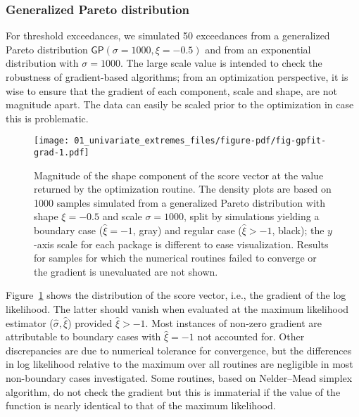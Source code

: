\documentclass[
  letterpaper,
  DIV=11,
  numbers=noendperiod]{scrartcl}
\begin{document}
\hypertarget{generalized-pareto-distribution}{%
\subsubsection{Generalized Pareto
distribution}\label{generalized-pareto-distribution}}

For threshold exceedances, we simulated 50 exceedances from a
generalized Pareto distribution \(\mathsf{GP}(\sigma=1000, \xi=-0.5)\)
and from an exponential distribution with \(\sigma=1000\). The large
scale value is intended to check the robustness of gradient-based
algorithms; from an optimization perspective, it is wise to ensure that
the gradient of each component, scale and shape, are not magnitude
apart. The data can easily be scaled prior to the optimization in case
this is problematic.

\begin{figure}

{\centering \texttt{[image: 01\_univariate\_extremes\_files/figure-pdf/fig-gpfit-grad-1.pdf]}

}

\caption{\label{fig-gpfit-grad}Magnitude of the shape component of the
score vector at the value returned by the optimization routine. The
density plots are based on 1000 samples simulated from a generalized
Pareto distribution with shape \(\xi =-0.5\) and scale \(\sigma=1000\),
split by simulations yielding a boundary case (\(\widehat{\xi} = -1\),
gray) and regular case (\(\widehat{\xi} > -1\), black); the \(y\)-axis
scale for each package is different to ease visualization. Results for
samples for which the numerical routines failed to converge or the
gradient is unevaluated are not shown.}

\end{figure}

Figure~\ref{fig-gpfit-grad} shows the distribution of the score vector,
i.e., the gradient of the log likelihood. The latter should vanish when
evaluated at the maximum likelihood estimator
(\(\widehat{\sigma}, \widehat{\xi}\)) provided \(\widehat{\xi} > -1\).
Most instances of non-zero gradient are attributable to boundary cases
with \(\widehat{\xi}=-1\) not accounted for. Other discrepancies are due
to numerical tolerance for convergence, but the differences in log
likelihood relative to the maximum over all routines are negligible in
most non-boundary cases investigated. Some routines, based on
Nelder--Mead simplex algorithm, do not check the gradient but this is
immaterial if the value of the function is nearly identical to that of
the maximum likelihood.
\end{document}
